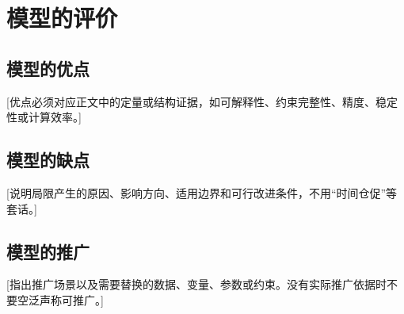 \section{模型的评价}

\subsection{模型的优点}

[优点必须对应正文中的定量或结构证据，如可解释性、约束完整性、精度、稳定性或计算效率。]

\subsection{模型的缺点}

[说明局限产生的原因、影响方向、适用边界和可行改进条件，不用“时间仓促”等套话。]

\subsection{模型的推广}

[指出推广场景以及需要替换的数据、变量、参数或约束。没有实际推广依据时不要空泛声称可推广。]
